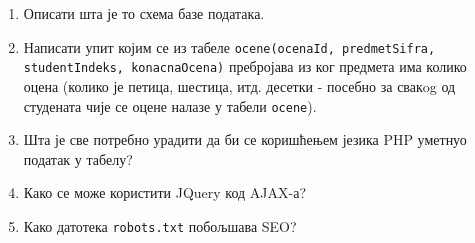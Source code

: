 \documentclass[a4paper]{article}
\begin{document}
\begin{enumerate}
\hrulefill

\hrulefill

\item Описати шта је то схема базе података.

\hrulefill

\hrulefill

\hrulefill

\item Написати упит којим се из табеле \verb|ocene(ocenaId, predmetSifra, studentIndeks, konacnaOcena)| 
пребројава из ког предмета има колико оцена (колико је петица, шестица, итд. десетки - посебно за свакog од 
студената чије се оцене налазе у табели \verb|ocene|).

\hrulefill

\hrulefill

\hrulefill

\item Шта је све потребно урадити да би се коришћењем језика PHP уметнуо податак у табелу?

\hrulefill

\hrulefill

\hrulefill

\item Како се може користити JQuery код AJAX-а?

\hrulefill

\hrulefill

\hrulefill

\item Како датотека \verb|robots.txt| побољшава SEO?

\hrulefill

\hrulefill

\hrulefill
\end{enumerate}
\end{document}
